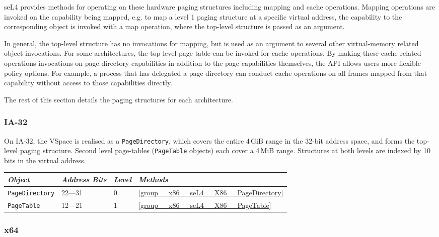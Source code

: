 seL4 provides methods for operating on these
hardware paging structures including mapping and cache operations. Mapping operations are invoked on
the capability being mapped, e.g. to map a level 1 paging structure at a specific virtual address,
the capability to the corresponding object is invoked with a map operation, where the top-level
structure is passed as an argument.

In general, the top-level structure has no invocations for mapping, but is used as an argument to
several other virtual-memory related object invocations.
For some architectures, the top-level page table can be invoked for cache operations.
By making these cache related operations invocations on page directory capabilities in addition to
the page capabilities themselves, the
API allows users more flexible policy options. For example, a process that has delegated a page
directory can conduct cache operations on all frames mapped from that capability without access
to those capabilities directly.

The rest of this section details the paging structures for each architecture.

\subsubsection{IA-32}

On IA-32, the VSpace is realised as a \texttt{PageDirectory}, which covers the entire 4\,GiB range
in the 32-bit address space, and forms the top-level paging structure. Second level page-tables
(\texttt{PageTable} objects) each cover a 4\,MiB range.
Structures at both levels are indexed by 10 bits in the virtual address.

\begin{tabularx}{\textwidth}{Xlll} \toprule
\emph{Object}          & \emph{Address Bits} & \emph{Level} & \emph{Methods} \\ \midrule
\texttt{PageDirectory} & 22---31             & 0            & \autoref{group__x86__seL4__X86__PageDirectory} \\
\texttt{PageTable}     & 12---21             & 1            & \autoref{group__x86__seL4__X86__PageTable} \\
\bottomrule
\end{tabularx}

\subsubsection{x64}

